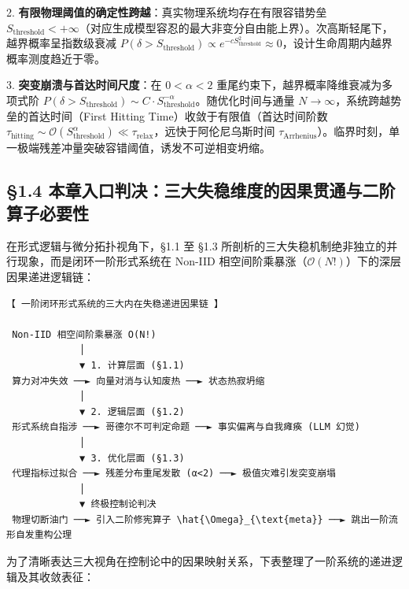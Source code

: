 \documentclass[11pt,a4paper,oneside]{ctexart}
\begin{document}
2. \textbf{有限物理阈值的确定性跨越}：真实物理系统均存在有限容错势垒 $S_{\text{threshold}} < +\infty$（对应生成模型容忍的最大非变分自由能上界）。次高斯轻尾下，越界概率呈指数级衰减 $P(\delta > S_{\text{threshold}}) \propto e^{-c S_{\text{threshold}}^2} \approx 0$，设计生命周期内越界概率测度趋近于零。

3. \textbf{突变崩溃与首达时间尺度}：在 $0 < \alpha < 2$ 重尾约束下，越界概率降维衰减为多项式阶 $P(\delta > S_{\text{threshold}}) \sim C \cdot S_{\text{threshold}}^{-\alpha}$。随优化时间与通量 $N \to \infty$，系统跨越势垒的首达时间（First Hitting Time）收敛于有限值（首达时间阶数 $\tau_{\text{hitting}} \sim \mathcal{O}(S_{\text{threshold}}^\alpha) \ll \tau_{\text{relax}}$，远快于阿伦尼乌斯时间 $\tau_{\text{Arrhenius}}$）。临界时刻，单一极端残差冲量突破容错阈值，诱发不可逆相变坍缩。


\subsection{§1.4 本章入口判决：三大失稳维度的因果贯通与二阶算子必要性}

在形式逻辑与微分拓扑视角下，§1.1 至 §1.3 所剖析的三大失稳机制\textit{}绝非独立的并行现象，而是闭环一阶形式系统在 Non-IID 相空间阶乘暴涨（$\mathcal{O}(N!)$）下的深层因果递进逻辑链\textit{}：


\begin{tcolorbox}[colback=gray!5!white,colframe=gray!50!black,fontupper=\ttfamily\small]
\begin{verbatim}
【 一阶闭环形式系统的三大内在失稳递进因果链 】

 Non-IID 相空间阶乘暴涨 O(N!)
             │
             ▼ 1. 计算层面 (§1.1)
 算力对冲失效 ──► 向量对消与认知废热 ──► 状态热寂坍缩
             │
             ▼ 2. 逻辑层面 (§1.2)
 形式系统自指涉 ──► 哥德尔不可判定命题 ──► 事实偏离与自我瘫痪 (LLM 幻觉)
             │
             ▼ 3. 优化层面 (§1.3)
 代理指标过拟合 ──► 残差分布重尾发散 (α<2) ──► 极值灾难引发突变崩塌
             │
             ▼ 终极控制论判决
 物理切断油门 ──► 引入二阶修宪算子 \hat{\Omega}_{\text{meta}} ──► 跳出一阶流形自发重构公理
\end{verbatim}
\end{tcolorbox}

为了清晰表达三大视角在控制论中的因果映射关系，下表整理了一阶系统的递进逻辑及其收敛表征：
\end{document}
